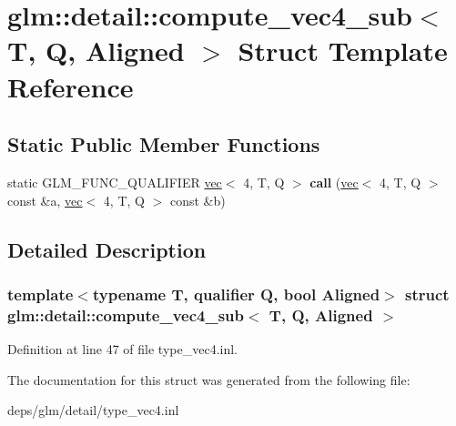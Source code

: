 \hypertarget{structglm_1_1detail_1_1compute__vec4__sub}{}\section{glm\+:\+:detail\+:\+:compute\+\_\+vec4\+\_\+sub$<$ T, Q, Aligned $>$ Struct Template Reference}
\label{structglm_1_1detail_1_1compute__vec4__sub}
\subsection*{Static Public Member Functions}
\begin{DoxyCompactItemize}
\item 
\mbox{\label{structglm_1_1detail_1_1compute__vec4__sub_a3f6c03dd3f8dcb8d955a41e8f150094c}} 
static G\+L\+M\+\_\+\+F\+U\+N\+C\+\_\+\+Q\+U\+A\+L\+I\+F\+I\+ER \hyperlink{structglm_1_1vec}{vec}$<$ 4, T, Q $>$ {\bfseries call} (\hyperlink{structglm_1_1vec}{vec}$<$ 4, T, Q $>$ const \&a, \hyperlink{structglm_1_1vec}{vec}$<$ 4, T, Q $>$ const \&b)
\end{DoxyCompactItemize}


\subsection{Detailed Description}
\subsubsection*{template$<$typename T, qualifier Q, bool Aligned$>$\newline
struct glm\+::detail\+::compute\+\_\+vec4\+\_\+sub$<$ T, Q, Aligned $>$}



Definition at line 47 of file type\+\_\+vec4.\+inl.



The documentation for this struct was generated from the following file\+:\begin{DoxyCompactItemize}
\item 
deps/glm/detail/type\+\_\+vec4.\+inl\end{DoxyCompactItemize}
